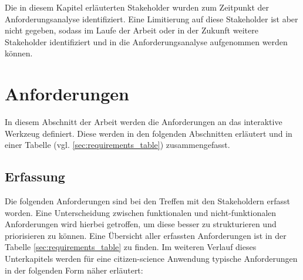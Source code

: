 Die in diesem Kapitel erläuterten Stakeholder wurden zum Zeitpunkt der Anforderungsanalyse identifiziert. Eine Limitierung auf diese Stakeholder ist aber nicht gegeben, sodass im Laufe der Arbeit oder in der Zukunft weitere Stakeholder identifiziert und in die Anforderungsanalyse aufgenommen werden können.

\section{Anforderungen}
In diesem Abschnitt der Arbeit werden die Anforderungen an das interaktive Werkzeug definiert. Diese werden in den folgenden Abschnitten erläutert und in einer Tabelle (vgl. \ref{sec:requirements_table}) zusammengefasst.

\subsection{Erfassung}
Die folgenden Anforderungen sind bei den Treffen mit den Stakeholdern erfasst worden. Eine Unterscheidung zwischen funktionalen und nicht-funktionalen Anforderungen wird hierbei getroffen, um diese besser zu strukturieren und priorisieren zu können. Eine Übersicht aller erfassten Anforderungen ist in der Tabelle \ref{sec:requirements_table} zu finden. Im weiteren Verlauf dieses Unterkapitels werden für eine citizen-science Anwendung typische Anforderungen in der folgenden Form näher erläutert:

